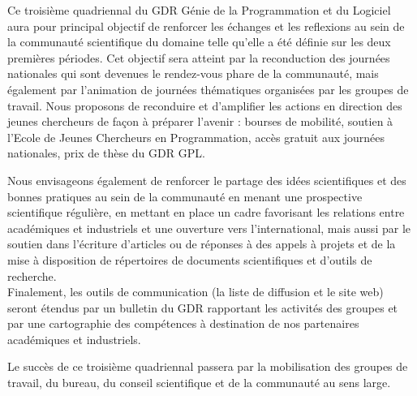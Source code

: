 \documentclass[11pt]{article}
\begin{document}
Ce troisième quadriennal du GDR Génie de la Programmation et du Logiciel aura
pour principal objectif de renforcer les échanges et les reflexions au sein de
la communauté scientifique du domaine telle qu'elle a été définie sur les deux
premières périodes. 
Cet objectif sera atteint par la reconduction des journées nationales qui sont
devenues le rendez-vous phare de la communauté, mais également par l'animation
de journées thématiques organisées par les groupes de travail. Nous proposons
de reconduire et d'amplifier les actions en direction des jeunes chercheurs de
façon à préparer l'avenir : bourses de mobilité, soutien à l'Ecole de Jeunes
Chercheurs en Programmation, accès gratuit aux journées nationales, prix de
thèse du GDR GPL.

Nous envisageons également de renforcer le partage des idées scientifiques et
des bonnes pratiques au sein de la communauté en menant une prospective
scientifique régulière, en mettant en place un cadre favorisant les relations
entre académiques et industriels et une ouverture vers l'international, mais
aussi par le soutien dans l'écriture d'articles ou de réponses à des appels à
projets et de la mise à disposition de répertoires de documents scientifiques
et d'outils de recherche. 
\\

Finalement, les outils de communication (la liste de diffusion et le site web) seront étendus par un bulletin du GDR rapportant les activités des groupes et par une cartographie des compétences à destination de nos partenaires académiques et industriels.

Le succès de ce troisième quadriennal passera par la mobilisation des groupes
de travail, du bureau, du conseil scientifique et de la communauté au sens
large.


\end{document}
